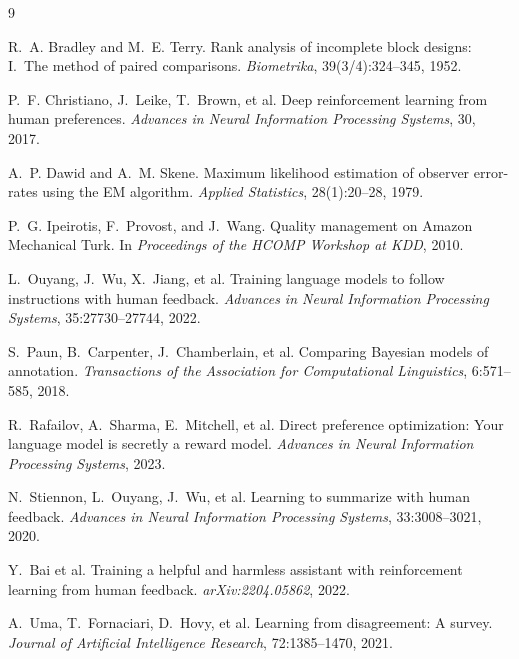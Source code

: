 \documentclass[11pt, a4paper]{article}
\begin{document}

\begin{thebibliography}{9}

R.~A. Bradley and M.~E. Terry.
\newblock Rank analysis of incomplete block designs: I.\ The method of paired comparisons.
\newblock \textit{Biometrika}, 39(3/4):324--345, 1952.

P.~F. Christiano, J.~Leike, T.~Brown, et al.
\newblock Deep reinforcement learning from human preferences.
\newblock \textit{Advances in Neural Information Processing Systems}, 30, 2017.

A.~P. Dawid and A.~M. Skene.
\newblock Maximum likelihood estimation of observer error-rates using the EM algorithm.
\newblock \textit{Applied Statistics}, 28(1):20--28, 1979.

P.~G. Ipeirotis, F.~Provost, and J.~Wang.
\newblock Quality management on Amazon Mechanical Turk.
\newblock In \textit{Proceedings of the HCOMP Workshop at KDD}, 2010.

L.~Ouyang, J.~Wu, X.~Jiang, et al.
\newblock Training language models to follow instructions with human feedback.
\newblock \textit{Advances in Neural Information Processing Systems}, 35:27730--27744, 2022.

S.~Paun, B.~Carpenter, J.~Chamberlain, et al.
\newblock Comparing Bayesian models of annotation.
\newblock \textit{Transactions of the Association for Computational Linguistics}, 6:571--585, 2018.

R.~Rafailov, A.~Sharma, E.~Mitchell, et al.
\newblock Direct preference optimization: Your language model is secretly a reward model.
\newblock \textit{Advances in Neural Information Processing Systems}, 2023.

N.~Stiennon, L.~Ouyang, J.~Wu, et al.
\newblock Learning to summarize with human feedback.
\newblock \textit{Advances in Neural Information Processing Systems}, 33:3008--3021, 2020.

Y.~Bai et al.
\newblock Training a helpful and harmless assistant with reinforcement learning from human feedback.
\newblock \textit{arXiv:2204.05862}, 2022.

A.~Uma, T.~Fornaciari, D.~Hovy, et al.
\newblock Learning from disagreement: A survey.
\newblock \textit{Journal of Artificial Intelligence Research}, 72:1385--1470, 2021.

\end{thebibliography}
\end{document}
